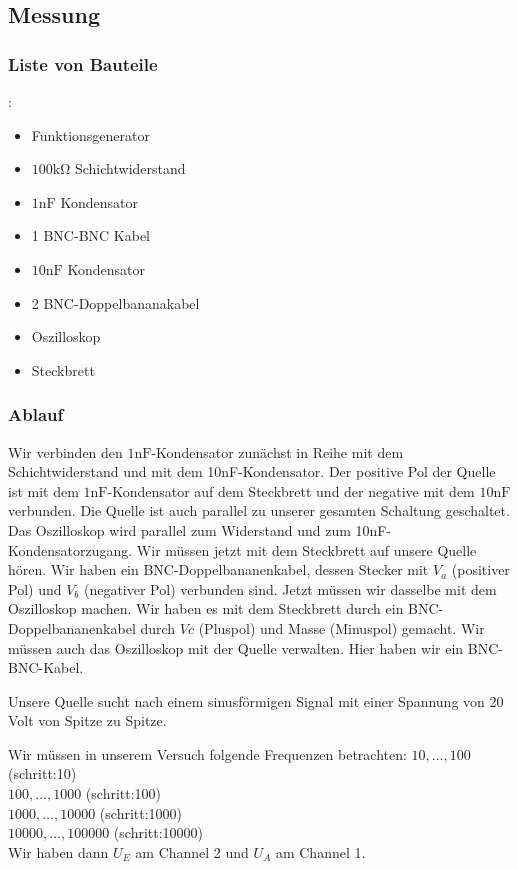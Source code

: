 %
\subsection{Messung}
\label{subsec:3_Messung}
%
%
\subsubsection{Liste von Bauteile}:
\begin{itemize}
  \item Funktionsgenerator
  \item $100 \si{\kilo\ohm}$ Schichtwiderstand
  \item $1\si{\nano\farad}$ Kondensator
  \item 1 BNC-BNC Kabel
  \item $10 \si{\nano\farad}$ Kondensator
  \item 2 BNC-Doppelbananakabel
  \item Oszilloskop
  \item Steckbrett
\end{itemize}
\subsubsection{Ablauf}
Wir verbinden den $1\si{\nano\farad}$-Kondensator zunächst in Reihe mit dem Schichtwiderstand und mit dem 10nF-Kondensator. Der positive Pol der Quelle ist mit dem $1\si{\nano\farad}$-Kondensator auf dem Steckbrett und der negative mit dem $10 \si{\nano\farad}$ verbunden. Die Quelle ist auch parallel zu unserer gesamten Schaltung geschaltet. Das Oszilloskop wird parallel zum Widerstand und zum 10nF-Kondensatorzugang. Wir müssen jetzt mit dem Steckbrett auf unsere Quelle hören. Wir haben ein BNC-Doppelbananenkabel, dessen Stecker mit $V_a$ (positiver Pol) und $V_b$ (negativer Pol) verbunden sind. Jetzt müssen wir dasselbe mit dem Oszilloskop machen. Wir haben es mit dem Steckbrett durch ein BNC-Doppelbananenkabel durch $Vc$ (Pluspol) und Masse (Minuspol) gemacht. Wir müssen auch das Oszilloskop mit der Quelle verwalten. Hier haben wir ein BNC-BNC-Kabel.

Unsere Quelle sucht nach einem sinusförmigen Signal mit einer Spannung von 20 Volt von Spitze zu Spitze.

Wir müssen in unserem Versuch folgende Frequenzen betrachten:
$10,\dots,100$ (schritt:10)\\
$100,\dots,1000$ (schritt:100)\\
$1000,\dots,10000$ (schritt:1000)\\
$10000,\dots,100000$ (schritt:10000)\\
Wir haben dann $U_E$ am Channel 2 und $U_A$ am Channel 1.

